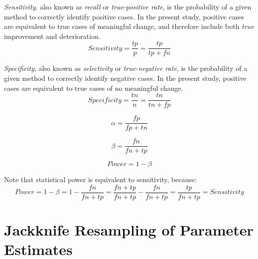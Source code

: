 \documentclass[12pt,twoside]{reedthesis}
\begin{document}
\par

\noindent
\emph{Sensitivity}, also known as \emph{recall} or \emph{true-positive rate}, is the probability of a given method to correctly identify positive cases. In the present study, positive cases are equivalent to true cases of meaningful change, and therefore include both \emph{true} improvement and deterioration.
\begin{equation}
Sensitivity = \frac{tp}{p} = \frac{tp}{tp + fn} \label{eq:sensitivity}
\end{equation}
\par

\noindent
\emph{Specificity}, also known as \emph{selectivity} or \emph{true-negative rate}, is the probability of a given method to correctly identify negative cases. In the present study, positive cases are equivalent to true cases of no meaningful change.
\begin{equation}
Specificity = \frac{tn}{n} = \frac{tn}{tn + fp} \label{eq:specificity}
\end{equation}
\par

\noindent
\begin{equation}
\alpha = \frac{fp}{fp + tn} \label{eq:alpha-error}
\end{equation}
\par

\noindent
\begin{equation}
\beta = \frac{fn}{fn + tp} \label{eq:beta-error}
\end{equation}
\par

\noindent
\begin{equation}
Power = 1 - \beta \label{eq:power}
\end{equation}
\par

\noindent
Note that statistical power is equivalent to sensitivity, because:
\begin{equation}
Power = 1 - \beta = 1 - \frac{fn}{fn + tp} = \frac{fn + tp}{fn + tp} - \frac{fn}{fn + tp} = \frac{tp}{fn + tp} = Sensitivity \label{eq:power-sens-equiv}
\end{equation}
\par

\noindent

\hypertarget{jackknife-resampling-of-parameter-estimates}{%
\section{Jackknife Resampling of Parameter Estimates}\label{jackknife-resampling-of-parameter-estimates}}
\end{document}
